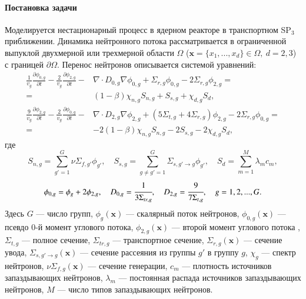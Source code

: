\documentclass{crm-article}
\begin{document}
\paragraph{Постановка задачи}
Моделируется нестационарный процесс в ядерном реакторе в транспортном SP$_3$ приближении. 
Динамика нейтронного потока рассматривается в ограниченной выпуклой двухмерной или трехмерной области  $\Omega$ ($\bm x = \{x_1, ..., x_d\} \in \Omega, \ d = 2,3$) с границей $\partial \Omega$. 
Перенос нейтронов описывается системой уравнений:
\begin{equation}\label{1}
\begin{split}
 \frac{1}{v_g} \frac{\partial \phi_{0,g}}{\partial t} - \frac{2}{v_g} \frac{\partial \phi_{2,g}}{\partial t} - & \nabla \cdot D_{0,g} \nabla \phi_{0,g} + \Sigma_{r,g} \phi_{0,g} -  2\Sigma_{r,g} \phi_{2,g} = \\ 
 =  & (1-\beta)\chi_{n,g} S_{n,g} + S_{s,g} + \chi_{d,g} S_d, \\
 \frac{9}{v_g} \frac{\partial \phi_{2,g}}{\partial t} - \frac{2}{v_g} \frac{\partial \phi_{0,g}}{\partial t} - & \nabla \cdot D_{2,g} \nabla \phi_{2,g} + (5\Sigma_{t,g} + 4\Sigma_{r,g}) \phi_{2,g} -  2\Sigma_{r,g} \phi_{0,g} = \\ 
 =  & -2(1-\beta)\chi_{n,g} S_{n,g} - 2S_{s,g} - 2\chi_{d,g} S_d,
\end{split}
\end{equation}
где
\[
S_{n,g} =  \sum_{g'=1}^{G} \nu \Sigma_{f,g'} \phi_{g'}, 
\quad
S_{s,g} = \sum_{g\neq g'=1}^{G} \Sigma_{s,g'\rightarrow g} \phi_{g'},
\quad
S_{d} = \sum_{m=1}^{M} \lambda_m c_m,
\]
\[
\phi_{0,g}=\phi_g + 2\phi_{2,g}, 
\quad
D_{0,g} = \cfrac{1}{3\Sigma_{tr,g}}, 
\quad
D_{2,g} = \cfrac{9}{7\Sigma_{t,g}}, 
\quad g=1,2,...,G.
\]
Здесь $G$ --- число групп,
$\phi_g(\bm x)$ --- скалярный поток нейтронов,
$\phi_{0,g}(\bm x)$ --- псевдо 0-й момент углового потока,
$\phi_{2,g}(\bm x)$ --- второй момент углового потока ,
$\Sigma_{t,g}$ --- полное сечение, 
$\Sigma_{tr,g}$ --- транспортное сечение, 
 $\Sigma_{r,g}(\bm x)$ --- сечение увода,
$\Sigma_{s,g'\rightarrow g}(\bm x)$ --- сечение рассеяния из группы $g'$ в группу $g$,
$\chi_g$  --- спектр нейтронов, 
$\nu\Sigma_{f,g}(\bm x)$ --- сечение генерации,
$c_m$ --- плотность источников запаздывающих нейтронов,
$\lambda_m$ --- постоянная распада источников запаздывающих нейтронов,
$M$ --- число типов запаздывающих нейтронов.
\end{document}
